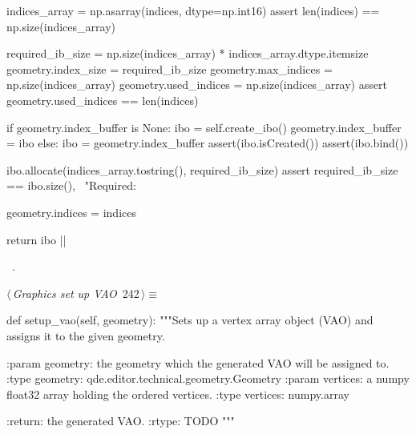 \documentclass[%
    a4paper,    %
    justified,  %
    nobib,      %
    openany     %
]{tufte-book}
\makeatletter
\renewcommand{\label}[1]{\@tufte@label{##1}}%
\makeatother
\begin{document}
\begin{fullwidth}
\begin{flushleft}
\begin{minipage}{\linewidth}
\begin{pythoncode}
    indices_array = np.asarray(indices, dtype=np.int16)
    assert len(indices) == np.size(indices_array)

    required_ib_size      = np.size(indices_array) * indices_array.dtype.itemsize
    geometry.index_size   = required_ib_size
    geometry.max_indices  = np.size(indices_array)
    geometry.used_indices = np.size(indices_array)
    assert geometry.used_indices == len(indices)

    if geometry.index_buffer is None:
        ibo = self.create_ibo()
        geometry.index_buffer = ibo
    else:
        ibo = geometry.index_buffer
    assert(ibo.isCreated())
    assert(ibo.bind())

    ibo.allocate(indices_array.tostring(), required_ib_size)
    assert required_ib_size == ibo.size(), \
        "Required: %

    geometry.indices = indices

    return ibo
|\NWsep|
\end{pythoncode}
\vspace{1.5ex}
\footnotesize
\begin{list}{}{\setlength{\itemsep}{-\parsep}\setlength{\itemindent}{-\leftmargin}}
\item \NWtxtMacroRefIn\ \NWlink{nuweb224}{224}.

\item{}
\end{list}
\end{minipage}\vspace{4ex}
\end{flushleft}
\begin{flushleft} \small
\begin{minipage}{\linewidth}\label{scrap262}\raggedright\small
{} $\langle\,${\itshape Graphics set up VAO}\nobreak\ {\footnotesize {242}}$\,\rangle\equiv$
\vspace{-1ex}
\begin{pythoncode}
def setup_vao(self, geometry):
    """Sets up a vertex array object (VAO) and assigns it to the given
    geometry.

    :param geometry: the geometry which the generated VAO will be assigned
                     to.
    :type geometry:  qde.editor.technical.geometry.Geometry
    :param vertices: a numpy float32 array holding the ordered vertices.
    :type vertices:  numpy.array

    :return:         the generated VAO.
    :rtype:          TODO
    """


\end{pythoncode}
\end{minipage}
\end{flushleft}
\end{fullwidth}
\end{document}
